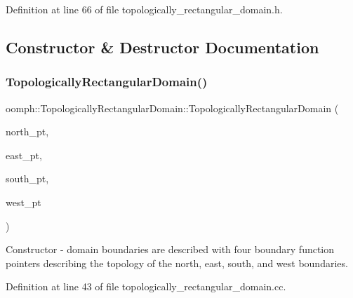 Definition at line 66 of file topologically\+\_\+rectangular\+\_\+domain.\+h.



\subsection{Constructor \& Destructor Documentation}
\mbox{\label{classoomph_1_1TopologicallyRectangularDomain_acd15ad13385a5077c83f73008638f4fe}} 
\subsubsection{\texorpdfstring{Topologically\+Rectangular\+Domain()}{TopologicallyRectangularDomain()}\hspace{0.1cm}{\footnotesize\ttfamily [1/4]}}
{\footnotesize\ttfamily oomph\+::\+Topologically\+Rectangular\+Domain\+::\+Topologically\+Rectangular\+Domain (\begin{DoxyParamCaption}\item[{\hyperlink{classoomph_1_1TopologicallyRectangularDomain_a8b2e24f5500d86c93aef509c5410e7cc}{Boundary\+Fct\+Pt}}]{north\+\_\+pt,  }\item[{\hyperlink{classoomph_1_1TopologicallyRectangularDomain_a8b2e24f5500d86c93aef509c5410e7cc}{Boundary\+Fct\+Pt}}]{east\+\_\+pt,  }\item[{\hyperlink{classoomph_1_1TopologicallyRectangularDomain_a8b2e24f5500d86c93aef509c5410e7cc}{Boundary\+Fct\+Pt}}]{south\+\_\+pt,  }\item[{\hyperlink{classoomph_1_1TopologicallyRectangularDomain_a8b2e24f5500d86c93aef509c5410e7cc}{Boundary\+Fct\+Pt}}]{west\+\_\+pt }\end{DoxyParamCaption})}



Constructor -\/ domain boundaries are described with four boundary function pointers describing the topology of the north, east, south, and west boundaries. 



Definition at line 43 of file topologically\+\_\+rectangular\+\_\+domain.\+cc.



